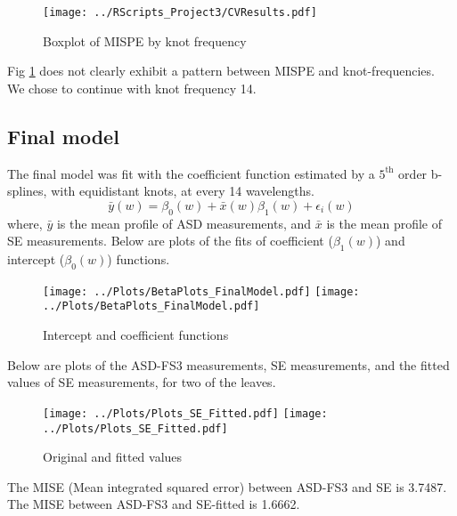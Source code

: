 \begin{figure}[H]
\centering
\texttt{[image: ../RScripts\_Project3/CVResults.pdf]}
\caption{Boxplot of MISPE by knot frequency}
\label{fig:Fig3.1}
\end{figure}

Fig \ref{fig:Fig3.1} does not clearly exhibit a pattern between MISPE and knot-frequencies. We chose to continue with knot frequency 14. 

\subsection*{Final model}
The final model was fit with the coefficient function estimated by a $5^{\text{th}}$ order b-splines, with equidistant knots, at every 14 wavelengths. 
\begin{equation}
\bar{y}(w) = \beta_0(w) + \bar{x}(w) \beta_1(w) + \epsilon_i(w) 
\label{eq:Eq3.2}
\end{equation} 
where, $\bar{y}$ is the mean profile of ASD measurements, and $\bar{x}$ is the mean profile  of SE measurements. Below are plots of the fits of coefficient ($\beta_1(w)$) and intercept ($\beta_0(w)$) functions.

\begin{figure}[H]
\centering
\texttt{[image: ../Plots/BetaPlots\_FinalModel.pdf]}
\hspace{0.5cm}
\texttt{[image: ../Plots/BetaPlots\_FinalModel.pdf]}
\caption{Intercept and coefficient functions}
\label{fig:Fig3.2}
\end{figure}

Below are plots of the ASD-FS3 measurements, SE measurements, and the fitted values of SE measurements, for two of the leaves.
\begin{figure}[H]
\centering
\texttt{[image: ../Plots/Plots\_SE\_Fitted.pdf]}
\hspace{0.5cm}
\texttt{[image: ../Plots/Plots\_SE\_Fitted.pdf]}
\caption{Original and fitted values}
\label{fig:Fig3.3}
\end{figure}

The MISE (Mean integrated squared error) between ASD-FS3 and SE is 3.7487. The MISE between ASD-FS3 and SE-fitted is 1.6662. 